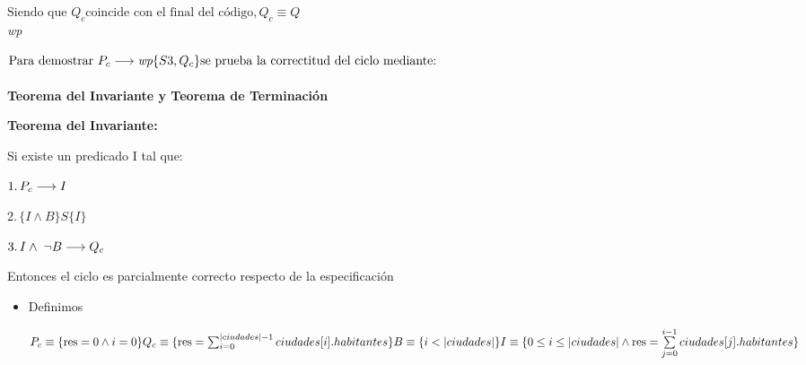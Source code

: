 \documentclass[10pt,a4paper]{article}
\begin{document}
$ \text{Siendo que } Q_{c}  \text{coincide con el final del código},  Q_{c} \equiv Q $\\
 \implica \textit{wp}

\vspace{0.3cm}

$\text{Para demostrar } P_{c} \longrightarrow \textit{wp} \{{S3,Q_{c}\}} \text{se prueba la correctitud del ciclo mediante:}$ \\
\vspace*{1cm} \\
\textbf{Teorema del Invariante y Teorema de Terminación}


\textbf{Teorema del Invariante:}

Si existe un predicado I tal que:

$1. \, P_{c} \longrightarrow I$

$2. \, \{I \wedge B\} S \{I\}$

$3. \, I \wedge \; \neg B \longrightarrow Q_{c}$

Entonces el ciclo es parcialmente correcto respecto de la especificación

\vspace{0.3cm}
\begin{itemize}

	\item{Definimos}

	      $P_{c}  \equiv \{ \text{res} = 0 \wedge i=0 \}           \\ \vspace{0.1cm} Q_{c}  \equiv
		      \{ \text{res} = \sum_{i=0}^{|ciudades|-1} ciudades[i].habitantes \} \\
		      \vspace{0.1cm} B  \equiv \{i < |ciudades| \}                       \\ \vspace{0.1cm} I  \equiv \{ 0
		      \leq i \leq |ciudades| \land \text{res} =
		      \sum\limits_{j=0}^{i-1}ciudades[j].habitantes \}$

\end{itemize}
\end{document}
